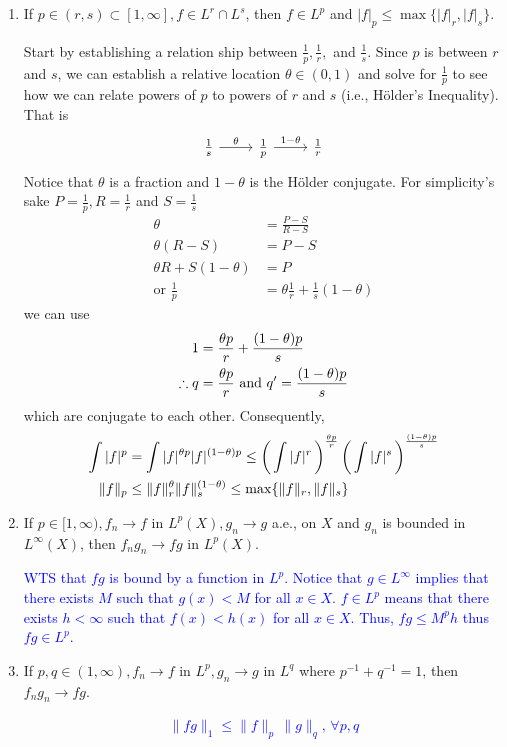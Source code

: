 \documentclass[12pt,a4paper]{report}
\newcommand{\BLUE}[1]{\textcolor{blue}{#1}}
\begin{document}
\begin{enumerate}
\newpage
\item If $p \in (r,s) \subset [1,\infty], f \in L^r\cap L^s$, then $f \in L^p$ and $|f|_p \le \max\{|f|_r, |f|_s\}$.

Start by establishing a relation ship between $\frac{1}{p}, \frac{1}{r},$ and $ \frac{1}{s}$.  Since $p$ is between $r$ and $s$, we can establish a relative location $\theta \in (0,1)$ and solve for $ \frac{1}{p}$ to see how we can relate powers of $p$ to powers of $r$ and $s$ (i.e., H\"older's Inequality).  That is
\[\begin{tikzcd}[row sep=small]
	\frac{1}{s} \arrow[r,"\theta"] & \frac{1}{p} \arrow[r,"1-\theta"] &\frac{1}{r}
\end{tikzcd}\]
Notice that $\theta$ is a fraction and $1-\theta$ is the H\"older conjugate.  For simplicity's sake $P= \frac{1}{p}, R =  \frac{1}{r}$ and $S =  \frac{1}{s}$
\begin{align*}
	\theta &= \frac{P-S}{R-S} \\
	\theta (R-S) &= P-S \\
    \theta R + S(1-\theta) &= P \\
	\text{or } \frac{1}{p} &= \theta \frac{1}{r} + \frac{1}{s}(1-\theta)
\end{align*}we can use
\begin{align*}
	1 &= \frac{\theta p}{r} + \frac{(1-\theta)p}{s} \\
	\therefore q &= \frac{\theta p}{r} \text{ and } q' = \frac{(1-\theta)p}{s}
\end{align*} which are conjugate to each other.  Consequently,
\begin{align*}
	\int |f|^p &= \int |f|^{\theta p}|f|^{(1-\theta)p} \le \left (\, \int |f|^r \,\right )^{\frac{\theta p}{r}}\left (\, \int|f|^s \,\right )^{\frac{(1-\theta)p}{s}} \\
	\|f\|_p &\le \|f\|_r^{\theta}\|f\|_s^{(1-\theta)} \le \max\{\|f\|_r,\|f\|_s\}
\end{align*} 

\newpage
\item If $p \in [1,\infty), f_n \to f$ in $L^p(X), g_n\to g$ a.e., on $X$ and $g_n$ is bounded in $L^\infty(X)$, then $f_ng_n \to fg$ in $L^p(X)$.

\BLUE{WTS that $fg$ is bound by a function in $L^p$.  Notice that $g \in L^\infty$ implies that there exists $M$ such that $g(x) < M$ for all $x \in X$.  $f \in L^p$ means that there exists $h < \infty$ such that $f(x) < h(x)$ for all $x\in X$.  Thus, $fg \le M^ph$ thus $fg \in L^p$.
}

\newpage
\item If $p,q \in (1, \infty), f_n \to f$ in $L^p, g_n\to g$ in $L^q$ where $p^{-1}+q^{-1}=1$, then $f_n g_n \to fg $.

\BLUE{
\begin{align*}
	\|fg\|_1 \le \|f\|_p\,\|g\|_q, \, \forall p,q
\end{align*}
}

\end{enumerate}
\end{document}
